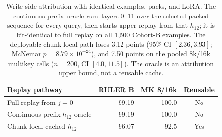 \begin{table}[!htbp]
\centering
\small
\setlength{\tabcolsep}{5pt}
\begin{tabular}{@{}lrrc@{}}
\toprule
\textbf{Replay pathway} & \textbf{RULER B} & \textbf{MK 8/16k} & \textbf{Reusable} \\
\midrule
Full replay from $j{=}0$ & 99.19 & 100.0 & No \\
Continuous-prefix $h_{12}$ oracle & 99.19 & 100.0 & No \\
Chunk-local cached $h_{12}$ & 96.07 & 92.5 & Yes \\
\bottomrule
\end{tabular}
\caption{Write-side attribution with identical examples, packs, and LoRA.
The continuous-prefix oracle runs layers 0--11 over the selected packed sequence
for every query, then starts upper replay from that $h_{12}$; it is bit-identical
to full replay on all 1,500 Cohort-B examples. The deployable chunk-local path
loses 3.12 points (95\% CI $[2.36,3.93]$; McNemar
$p{=}8.79\!\times\!10^{-24}$), and 7.50 points on the pooled 8k/16k multikey
cells ($n{=}200$, CI $[4.0,11.5]$). The oracle is an attribution upper bound,
not a reusable cache.}
\label{tab:h12-oracle}
\end{table}
